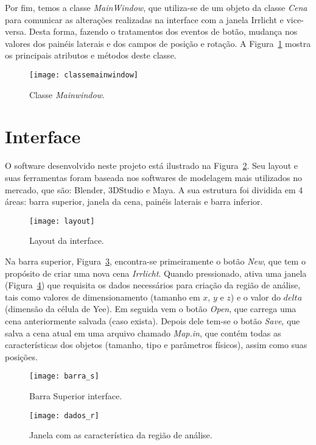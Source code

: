 	Por fim, temos a classe \textit{MainWindow}, que utiliza-se de um objeto da classe \textit{Cena} para comunicar as alterações realizadas na interface com a janela {Irrlicht} e vice-versa. Desta forma, fazendo o tratamentos dos eventos de botão, mudança nos valores  dos  painéis laterais e dos campos de posição e rotação. A Figura~\ref{fg:classemainwindow} mostra os principais atributos e métodos deste classe.
\begin{figure}[!ht]
	\centering
	\texttt{[image: classemainwindow]}
	\caption{Classe \textit{Mainwindow}.}
	\label{fg:classemainwindow}
\end{figure}

\section{Interface}
	O software desenvolvido neste projeto está ilustrado na Figura~\ref{fg:layout}. Seu layout e suas ferramentas foram baseada nos softwares de modelagem mais utilizados no mercado, que são: Blender, 3DStudio e Maya. A sua estrutura foi dividida em 4 áreas: barra superior, janela da cena, painéis laterais e barra inferior.
\begin{figure}[!ht]
	\centering
	\texttt{[image: layout]}
	\caption{Layout da interface.}
	\label{fg:layout}
\end{figure}

	Na barra superior, Figura~\ref{fg:barra_s}, encontra-se primeiramente o botão \textit{New}, que tem o propósito de criar uma nova cena \textit{Irrlicht}. Quando pressionado, ativa uma janela (Figura~\ref{fg:dados_r}) que requisita os dados necessários para criação da região de análise, tais como valores de dimensionamento (tamanho em $x$, $y$ e $z$) e o valor do $delta$ (dimensão da célula de Yee). Em seguida vem o botão \textit{Open}, que carrega uma cena anteriormente salvada (caso exista). Depois dele tem-se o botão \textit{Save}, que salva a cena atual em uma arquivo chamado \textit{Map.in}, que contém todas as características dos objetos (tamanho, tipo e parâmetros físicos), assim como suas posições.

\begin{figure}[!ht]
	\centering
	\texttt{[image: barra\_s]}
	\caption{Barra Superior interface.}
	\label{fg:barra_s}
\end{figure}
\begin{figure}[!ht]
	\centering
	\texttt{[image: dados\_r]}
	\caption{Janela com as característica da região de análise.}
	\label{fg:dados_r}
\end{figure}

